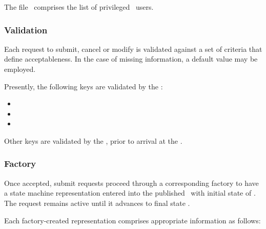     The file \varDuccAdministrators~comprises the list of privileged \varDUCC~users.
    
    \subsubsection{Validation} 
    
    Each request to submit, cancel or modify is validated against a set of
    criteria that define acceptableness. In the case of missing information,
    a default value may be employed.
    
    Presently, the following keys are validated by the \varOrchestrator:
    
    \begin{itemize}
      \item \varProcessThreadCount
      \item \varNumberOfInstances
      \item \varSchedulingClass
    \end{itemize} 
    
    Other keys are validated by the \varCommandLineInterface, prior to arrival
    at the \varOrchestrator.
    
    \subsubsection{Factory} 
    
    Once accepted, submit requests proceed through a corresponding factory
    to have a state machine representation entered into the published
    \varORmap~with initial state of \varReceived.  The request remains 
    active until it advances to final state \varCompleted.
    
    Each factory-created representation comprises appropriate information as follows:
    
